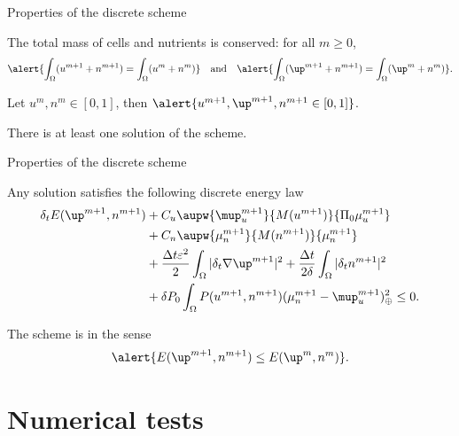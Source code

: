 \begin{frame}{Properties of the discrete scheme}
	\begin{proposition}
		The total mass of cells and nutrients is conserved: for all $m\ge 0$,
		\footnotesize
		\begin{align*}
		\alert{\int_\Omega (u^{m+1}+n^{m+1})=\int_\Omega (u^m+n^m)}\quad\text{and}\quad\alert{\int_\Omega (\up^{m+1}+n^{m+1})=\int_\Omega (\up^m+n^m)}.
		\end{align*}
	\end{proposition}
	\vspace*{0.3cm}
	\begin{theorem}
		Let $u^{m},n^{m}\in[0,1]$, then $\alert{u^{m+1},\up^{m+1},n^{m+1}\in[0,1]}$.
	\end{theorem}
	\vspace*{0.3cm}
	\begin{theorem}
		There is at least one solution of the scheme.
	\end{theorem}
\end{frame}
\begin{frame}{Properties of the discrete scheme}
	\begin{theorem}
		Any solution satisfies the following discrete energy law
		{\footnotesize
		\begin{align*}
			\delta_t E(\up^{m+1},n^{m+1})&+C_u\aupw{\mup_u^{m+1}}{M(u^{m+1})}{\Pi_0\mu_u^{m+1}}\\&+C_n\aupw{\mu_n^{m+1}}{M(n^{m+1})}{\mu_n^{m+1}}\notag\\&+\frac{\Delta t\varepsilon^2}{2}\int_\Omega|\delta_t\nabla \up^{m+1}|^2+\frac{\Delta t}{2\delta}\int_\Omega \vert\delta_t n^{m+1}\vert^2\nonumber\\&+\delta P_0\int_\Omega P(u^{m+1},n^{m+1}) (\mu_n^{m+1}-\mup_u^{m+1})_\oplus ^2
			\le 0.
		\end{align*}
		}
	\end{theorem}
	\begin{corollary}
		The scheme is  in the sense
		$$
		\alert{E(\up^{m+1},n^{m+1})\le E(\up^{m},n^{m})}.
		$$
	\end{corollary}
\end{frame}

\section{Numerical tests}

